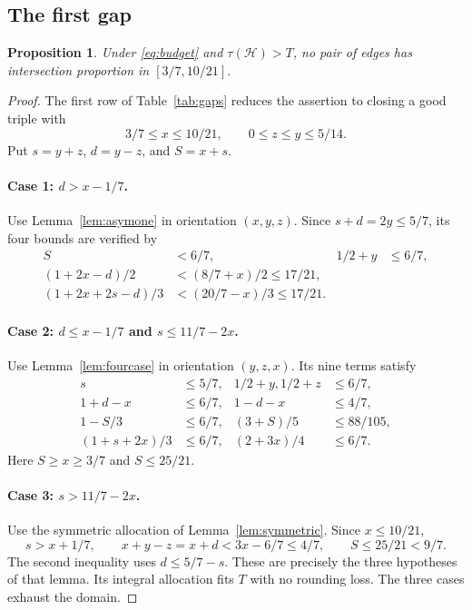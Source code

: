 \documentclass[11pt]{article}
\numberwithin{equation}{section}
\newtheorem{proposition}[theorem]{Proposition}
\theoremstyle{definition}
\theoremstyle{remark}
\newcommand{\HH}{\mathcal H}
\begin{document}
\subsection{The first gap}
\begin{proposition}\label{prop:gapone}
Under \eqref{eq:budget} and $\tau(\HH)>T$, no pair of edges has
intersection proportion in $[3/7,10/21]$.
\end{proposition}
\begin{proof}
The first row of Table~\ref{tab:gaps} reduces the assertion to closing
a good triple with
\[
 3/7\le x\le10/21,\qquad 0\le z\le y\le5/14.
\]
Put $s=y+z$, $d=y-z$, and $S=x+s$.

\paragraph{Case 1: $d>x-1/7$.}
Use Lemma~\ref{lem:asymone} in orientation $(x,y,z)$.
Since $s+d=2y\le5/7$, its four bounds are verified by
\begin{align*}
 S&<6/7,& 1/2+y&\le6/7,\\
 (1+2x-d)/2&<(8/7+x)/2\le17/21,\\
 (1+2x+2s-d)/3&<(20/7-x)/3\le17/21.
\end{align*}

\paragraph{Case 2: $d\le x-1/7$ and $s\le11/7-2x$.}
Use Lemma~\ref{lem:fourcase} in orientation $(y,z,x)$.
Its nine terms satisfy
\begin{align*}
 s&\le5/7,&1/2+y, 1/2+z&\le6/7,\\
 1+d-x&\le6/7,&1-d-x&\le4/7,\\
 1-S/3&\le6/7,&(3+S)/5&\le88/105,\\
 (1+s+2x)/3&\le6/7,&(2+3x)/4&\le6/7.
\end{align*}
Here $S\ge x\ge3/7$ and $S\le25/21$.

\paragraph{Case 3: $s>11/7-2x$.}
Use the symmetric allocation of Lemma~\ref{lem:symmetric}.
Since $x\le10/21$,
\[
 s>x+1/7,\qquad x+y-z=x+d<3x-6/7\le4/7,\qquad S\le25/21<9/7.
\]
The second inequality uses $d\le5/7-s$. These are precisely the three
hypotheses of that lemma. Its integral allocation fits $T$ with no
rounding loss. The three cases exhaust the domain.
\end{proof}
\end{document}
